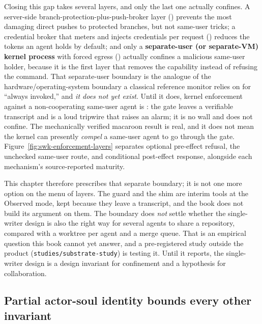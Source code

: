 \documentclass[11pt,a4paper]{article}
\theoremstyle{definition}
\theoremstyle{remark}
\begin{document}
Closing this gap takes several layers, and only the last one actually
confines.
A server-side branch-protection-plus-push-broker layer (\Designed) prevents the most
damaging direct pushes to protected branches, but not same-user tricks; a credential
broker that meters and injects credentials per request (\Vision) reduces the tokens
an agent holds by default; and only a \textbf{separate-user (or separate-VM) kernel
process} with forced egress (\Vision) actually confines a malicious same-user
holder, because it is the first layer that removes the capability instead of
refusing the command. That separate-user boundary is the analogue of the
hardware/operating-system boundary a classical reference monitor relies on for
``always invoked,'' and \emph{it does not yet exist}. Until it does, kernel
enforcement against a non-cooperating same-user agent is \NotGuar: the gate leaves
a verifiable transcript and is a loud tripwire that raises an alarm; it is no
wall and does not confine. The
mechanically verified macaroon result is real, and it does not mean the kernel can
presently \emph{compel} a same-user agent to go through the gate. Figure~\ref{fig:swk-enforcement-layers}
separates optional pre-effect refusal, the unchecked same-user route, and
conditional post-effect response, alongside each mechanism's source-reported maturity.


\FloatBarrier

This chapter therefore prescribes that separate boundary; it is not one more option
on the menu of layers. The guard and the shim are interim tools at the Observed mode,
kept because they leave a transcript, and the book does not build its argument on
them. The boundary does \emph{not} settle whether the single-writer design is also
the right way for several agents to share a repository, compared with a worktree
per agent and a merge queue. That is an empirical question this book cannot yet
answer, and a pre-registered study outside the product
(\texttt{studies/substrate-study}) is testing it. Until it reports, the
single-writer design is a design invariant for confinement and a hypothesis for
collaboration.

\subsection{Partial actor-soul identity bounds every other invariant}
\label{sec:swk-identity}
\end{document}
